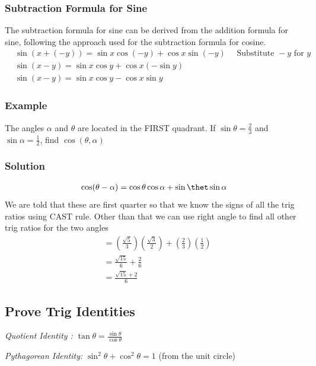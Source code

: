 \documentclass{article}
\begin{document}
\subsubsection{Subtraction Formula for Sine}
The subtraction formula for sine can be derived from the addition formula for sine, following the approach used for the subtraction formula for cosine.
$$
\begin{aligned}
& \sin (x+(-y))=\sin x \cos (-y)+\cos x \sin (-y) \quad \text { Substitute }-y \text { for } y \\
& \sin (x-y)=\sin x \cos y+\cos x(-\sin y) \\
& \sin (x-y)=\sin x \cos y-\cos x \sin y
\end{aligned}
$$

\subsubsection*{Example}
The angles $\alpha$ and $\theta$ are located in the FIRST quadrant. If $\sin\theta=\frac{2}{3}$ and $\sin \alpha=\frac{1}{2}$, find $\cos(\theta, \alpha)$

\subsubsection*{Solution}
\begin{align*}
    \cos(\theta- \alpha)&=\cos \theta \cos \alpha+\sin \thet  \sin \alpha\\
\end{align*}
We are told that these are first quarter  so that we know the signs of all the trig ratios using CAST rule. Other than that we can use right angle to find all other trig ratios for the two angles
\begin{align*}
    &=\left(\frac{\sqrt{5}}{3}\right)\left(\frac{\sqrt{3}}{2}\right)+\left(\frac{2}{3}\right)\left(\frac{1}{2}\right)\\
    &=\frac{\sqrt{15}}{6}+\frac{2}{6}\\
    &=\frac{\sqrt{15}+2}{6}
\end{align*}
\newpage

\subsection{Prove Trig Identities }


    \textit{Quotient Identity :} $\tan \theta=\frac{\sin \theta}{\cos \theta}$

\textit{Pythagorean Identity:} $\sin ^2 \theta+\cos ^2 \theta=1$ (from the unit circle)
\end{document}
